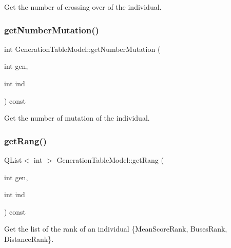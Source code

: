 Get the number of crossing over of the individual. 

\mbox{\label{class_generation_table_model_a501bf9195efc15cd8c9a56c6faa0a985}} 
\subsubsection{\texorpdfstring{get\+Number\+Mutation()}{getNumberMutation()}}
{\footnotesize\ttfamily int Generation\+Table\+Model\+::get\+Number\+Mutation (\begin{DoxyParamCaption}\item[{int}]{gen,  }\item[{int}]{ind }\end{DoxyParamCaption}) const}



Get the number of mutation of the individual. 

\mbox{\label{class_generation_table_model_a46e66d82198f53e67a5b085908bf33e6}} 
\subsubsection{\texorpdfstring{get\+Rang()}{getRang()}}
{\footnotesize\ttfamily Q\+List$<$ int $>$ Generation\+Table\+Model\+::get\+Rang (\begin{DoxyParamCaption}\item[{int}]{gen,  }\item[{int}]{ind }\end{DoxyParamCaption}) const}



Get the list of the rank of an individual \{Mean\+Score\+Rank, Buses\+Rank, Distance\+Rank\}. 

\mbox{\label{class_generation_table_model_a4a5fc6202b2110ab2cfe69bf482f7c33}} 
